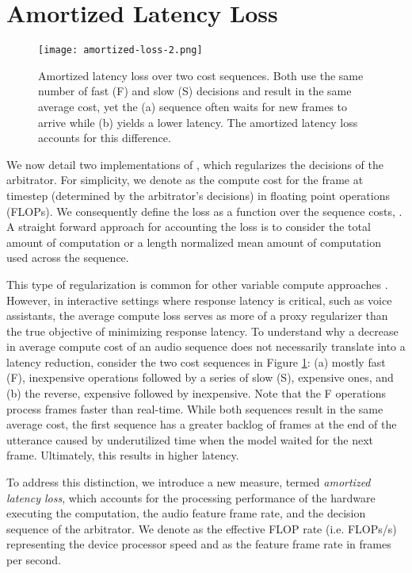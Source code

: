 \documentclass[a4paper]{article}
\begin{document}
\section{Amortized Latency Loss}
\label{sec:am_latency_loss}
\begin{figure}[t!]
	\vspace{-2.0mm}
	\texttt{[image: amortized-loss-2.png]}
	\vspace{-2.0mm}
	\caption{\small Amortized latency loss over two cost sequences. Both use the same number of fast (F) and slow (S) decisions and result in the same average cost, yet the (a) sequence often waits for new frames to arrive while (b) yields a lower latency. The amortized latency loss accounts for this difference.}
	\vspace{-4.0mm}
	\label{fig:amortized_loss}
\end{figure}

We now detail two implementations of , which regularizes the decisions of the arbitrator.
For simplicity, we denote  as the compute cost for the frame at timestep  (determined by the arbitrator's decisions) in floating point operations (FLOPs). We consequently define the loss as a function over the sequence costs, .
A straight forward approach for accounting the loss is to consider the total amount of computation or a length normalized mean amount of computation used across the sequence.

\noindent

\noindent
This type of regularization is common for other variable compute approaches \cite{Tyagi2020,Bengio2015b,Graves2016}.
However, in interactive settings where response latency is critical, such as voice assistants, the average compute loss serves as more of a proxy regularizer than the true objective of minimizing response latency.
To understand why a decrease in average compute cost of an audio sequence does not necessarily translate into a latency reduction, consider the two cost sequences in Figure \ref{fig:amortized_loss}: (a) mostly fast (F), inexpensive operations followed by a series of slow (S), expensive ones, and (b) the reverse, expensive followed by inexpensive.
Note that the F operations process frames faster than real-time.
While both sequences result in the same average cost, the first sequence has a greater backlog of frames at the end of the utterance caused by underutilized time when the model waited for the next frame. Ultimately, this results in higher latency. 

To address this distinction, we introduce a new measure, termed \emph{amortized latency loss}, which accounts for the processing performance of the hardware executing the computation, the audio feature frame rate, and the decision sequence of the arbitrator.
We denote  as the effective FLOP rate (i.e. FLOPs/s) representing the device processor speed and  as the feature frame rate in frames per second.
\end{document}

